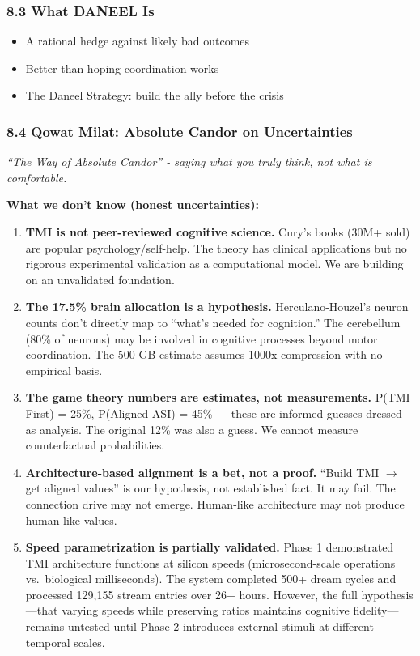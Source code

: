 \documentclass[
]{article}
\providecommand{\tightlist}{%
  \setlength{\itemsep}{0pt}\setlength{\parskip}{0pt}}
\begin{document}
\hypertarget{what-daneel-is}{%
\subsubsection{8.3 What DANEEL Is}\label{what-daneel-is}}

\begin{itemize}
\tightlist
\item
  A rational hedge against likely bad outcomes
\item
  Better than hoping coordination works
\item
  The Daneel Strategy: build the ally before the crisis
\end{itemize}

\hypertarget{qowat-milat-absolute-candor-on-uncertainties}{%
\subsubsection{8.4 Qowat Milat: Absolute Candor on
Uncertainties}\label{qowat-milat-absolute-candor-on-uncertainties}}

\emph{``The Way of Absolute Candor'' - saying what you truly think, not
what is comfortable.}

\textbf{What we don't know (honest uncertainties):}

\begin{enumerate}
\def\labelenumi{\arabic{enumi}.}
\item
  \textbf{TMI is not peer-reviewed cognitive science.} Cury's books
  (30M+ sold) are popular psychology/self-help. The theory has clinical
  applications but no rigorous experimental validation as a
  computational model. We are building on an unvalidated foundation.
\item
  \textbf{The 17.5\% brain allocation is a hypothesis.}
  Herculano-Houzel's neuron counts don't directly map to ``what's needed
  for cognition.'' The cerebellum (80\% of neurons) may be involved in
  cognitive processes beyond motor coordination. The 500 GB estimate
  assumes 1000x compression with no empirical basis.
\item
  \textbf{The game theory numbers are estimates, not measurements.}
  P(TMI First) = 25\%, P(Aligned ASI) = 45\% --- these are informed
  guesses dressed as analysis. The original 12\% was also a guess. We
  cannot measure counterfactual probabilities.
\item
  \textbf{Architecture-based alignment is a bet, not a proof.} ``Build
  TMI $\rightarrow$ get aligned values'' is our hypothesis, not established fact. It
  may fail. The connection drive may not emerge. Human-like architecture
  may not produce human-like values.
\item
  \textbf{Speed parametrization is partially validated.} Phase 1
  demonstrated TMI architecture functions at silicon speeds
  (microsecond-scale operations vs.~biological milliseconds). The system
  completed 500+ dream cycles and processed 129,155 stream entries over
  26+ hours. However, the full hypothesis---that varying speeds while
  preserving ratios maintains cognitive fidelity---remains untested
  until Phase 2 introduces external stimuli at different temporal
  scales.
\end{enumerate}
\end{document}
